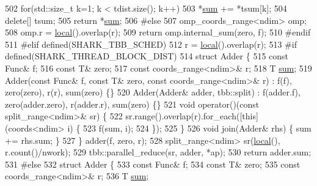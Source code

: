 \begin{DoxyCode}
502             \textcolor{keywordflow}{for}(std::size\_t k=1; k < tdist.size(); k++)
503                 *\hyperlink{classshark_1_1ndim_1_1_domain_a4acf8890a0637ff9987c4dea1f72bf79}{sum} += *tsum[k];
504             \textcolor{keyword}{delete}[] tsum;
505             \textcolor{keywordflow}{return} *\hyperlink{classshark_1_1ndim_1_1_domain_a4acf8890a0637ff9987c4dea1f72bf79}{sum};
506 \textcolor{preprocessor}{#else}
507             omp\_coords\_range<ndim> omp;
508             omp.r = \hyperlink{classshark_1_1ndim_1_1_domain_a3351db56f9d6bd22ba473d744e3f7025}{local}().overlap(r);
509             \textcolor{keywordflow}{return} omp.internal\_sum(zero, f);
510 \textcolor{preprocessor}{#endif}
511 \textcolor{preprocessor}{#elif defined(SHARK\_TBB\_SCHED)}
512             r = \hyperlink{classshark_1_1ndim_1_1_domain_a3351db56f9d6bd22ba473d744e3f7025}{local}().overlap(r);
513 \textcolor{preprocessor}{#if defined(SHARK\_THREAD\_BLOCK\_DIST)}
514             \textcolor{keyword}{struct }Adder \{
515                 \textcolor{keyword}{const} Func& f;
516                 \textcolor{keyword}{const} T& zero;
517                 \textcolor{keyword}{const} coords\_range<ndim>& r;
518                 T \hyperlink{classshark_1_1ndim_1_1_domain_a4acf8890a0637ff9987c4dea1f72bf79}{sum};
519                 Adder(\textcolor{keyword}{const} Func& f, \textcolor{keyword}{const} T& zero, \textcolor{keyword}{const} coords\_range<ndim>& r) : f(f), zero(zero), r(r), 
      sum(zero) \{\}
520                 Adder(Adder& adder, tbb::split) : f(adder.f), zero(adder.zero), r(adder.r), sum(zero) \{\}
521                 \textcolor{keywordtype}{void} operator()(\textcolor{keyword}{const} split\_range<ndim>& sr) \{
522                     sr.range().overlap(r).for\_each([\textcolor{keyword}{this}](coords<ndim> i) \{
523                         f(sum, i);
524                     \});
525                 \}
526                 \textcolor{keywordtype}{void} join(Adder& rhs) \{ sum += rhs.sum; \}
527             \} adder(f, zero, r);
528             split\_range<ndim> sr(\hyperlink{classshark_1_1ndim_1_1_domain_a3351db56f9d6bd22ba473d744e3f7025}{local}(), r.count()/nwork);
529             tbb::parallel\_reduce(sr, adder, *ap);
530             \textcolor{keywordflow}{return} adder.sum;
531 \textcolor{preprocessor}{#else}
532             \textcolor{keyword}{struct }Adder \{
533                 \textcolor{keyword}{const} Func& f;
534                 \textcolor{keyword}{const} T& zero;
535                 \textcolor{keyword}{const} coords\_range<ndim>& r;
536                 T \hyperlink{classshark_1_1ndim_1_1_domain_a4acf8890a0637ff9987c4dea1f72bf79}{sum};

\end{DoxyCode}
